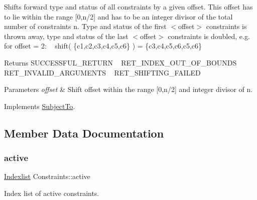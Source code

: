 Shifts forward type and status of all constraints by a given offset. This offset has to lie within the range \mbox{[}0,n/2\mbox{]} and has to be an integer divisor of the total number of constraints n. Type and status of the first $<$offset$>$ constraints is thrown away, type and status of the last $<$offset$>$ constraints is doubled, e.\+g. for offset = 2\+: ~\newline
shift( \{c1,c2,c3,c4,c5,c6\} ) = \{c3,c4,c5,c6,c5,c6\} \begin{DoxyReturn}{Returns}
S\+U\+C\+C\+E\+S\+S\+F\+U\+L\+\_\+\+R\+E\+T\+U\+RN ~\newline
 R\+E\+T\+\_\+\+I\+N\+D\+E\+X\+\_\+\+O\+U\+T\+\_\+\+O\+F\+\_\+\+B\+O\+U\+N\+DS ~\newline
 R\+E\+T\+\_\+\+I\+N\+V\+A\+L\+I\+D\+\_\+\+A\+R\+G\+U\+M\+E\+N\+TS ~\newline
 R\+E\+T\+\_\+\+S\+H\+I\+F\+T\+I\+N\+G\+\_\+\+F\+A\+I\+L\+ED 
\end{DoxyReturn}

\begin{DoxyParams}{Parameters}
{\em offset} & Shift offset within the range \mbox{[}0,n/2\mbox{]} and integer divisor of n. \\
\hline
\end{DoxyParams}


Implements \hyperlink{class_subject_to_af584328614003c2b9e92b185c6ceedc9}{Subject\+To}.



\subsection{Member Data Documentation}
\mbox{\label{class_constraints_a2fdcb864fec70473725bde4667d7923a}} 
\subsubsection{\texorpdfstring{active}{active}}
{\footnotesize\ttfamily \hyperlink{class_indexlist}{Indexlist} Constraints\+::active\hspace{0.3cm}{\ttfamily [protected]}}

Index list of active constraints. \mbox{\label{class_constraints_a4679ab5910823e575bb70ccd1c08fd25}} 
